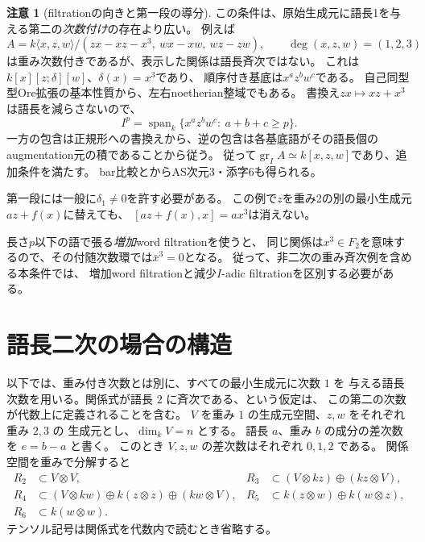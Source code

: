 \documentclass[11pt,a4paper]{ltjsarticle}
\theoremstyle{definition}
\newtheorem{remark}[theorem]{注意}
\begin{document}
\begin{remark}[filtrationの向きと第一段の導分]
この条件は、原始生成元に語長1を与える第二の\emph{次数付け}の存在より広い。
例えば
\[
 A=k\langle x,z,w\rangle/
 (zx-xz-x^3,\ wx-xw,\ wz-zw),
 \qquad \deg(x,z,w)=(1,2,3)
\]
は重み次数付きであるが、表示した関係は語長斉次ではない。
これは$k[x][z;\delta][w]$、$\delta(x)=x^3$であり、
順序付き基底は$x^a z^b w^c$である。
自己同型型Ore拡張の基本性質から、左右noetherian整域でもある。
書換え$zx\mapsto xz+x^3$は語長を減らさないので、
\[
 I^p=\operatorname{span}_k
 \{x^a z^b w^c:\ a+b+c\ge p\}.
\]
一方の包含は正規形への書換えから、逆の包含は各基底語がその語長個の
augmentation元の積であることから従う。
従って$\operatorname{gr}_I A\simeq k[x,z,w]$であり、追加条件を満たす。
bar比較と\cite[Corollary~D]{LPWZKoszul}からAS次元3・添字6も得られる。

第一段には一般に$\delta_1\ne0$を許す必要がある。
この例で$z$を重み2の別の最小生成元$az+f(x)$に替えても、
$[az+f(x),x]=a x^3$は消えない。

長さ$p$以下の語で張る\emph{増加}word filtrationを使うと、
同じ関係は$x^3\in F_2$を意味するので、その付随次数環では$\bar x^3=0$となる。
従って、非二次の重み斉次例を含める本条件では、
増加word filtrationと減少$I$-adic filtrationを区別する必要がある。
\end{remark}

\section{語長二次の場合の構造}
\label{sec:quadratic-general-structure}

以下では、重み付き次数とは別に、すべての最小生成元に次数 $1$ を
与える語長次数を用いる。関係式が語長 $2$ に斉次である、という仮定は、
この第二の次数が代数上に定義されることを含む。
$V$ を重み $1$ の生成元空間、$z,w$ をそれぞれ重み $2,3$ の
生成元とし、$\dim_kV=n$ とする。
語長 $a$、重み $b$ の成分の差次数を $e=b-a$ と書く。
このとき $V,z,w$ の差次数はそれぞれ $0,1,2$ である。
関係空間を重みで分解すると
\begin{align}
 R_2&\subset V\otimes V,&
 R_3&\subset (V\otimes kz)\oplus(kz\otimes V),\label{eq:general-relation-spaces-a}\\
 R_4&\subset(V\otimes kw)\oplus k(z\otimes z)
                    \oplus(kw\otimes V),&
 R_5&\subset k(z\otimes w)\oplus k(w\otimes z),\label{eq:general-relation-spaces-b}\\
 R_6&\subset k(w\otimes w).&&\label{eq:general-relation-spaces-c}
\end{align}
テンソル記号は関係式を代数内で読むとき省略する。
\end{document}
